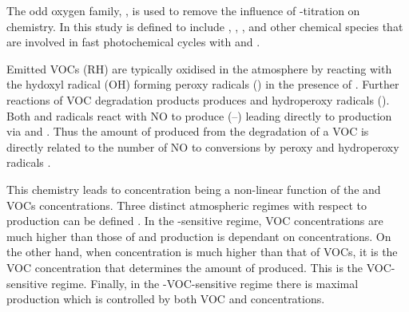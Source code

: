 The odd oxygen family, , is used to remove the influence of -titration on  chemistry. 
In this study  is defined to include , , ,  and other chemical species that are involved in fast photochemical cycles with  and . 

Emitted VOCs (RH) are typically oxidised in the atmosphere by reacting with the hydoxyl radical (OH) forming peroxy radicals () in the presence of  . 
Further reactions of VOC degradation products produces  and hydroperoxy radicals (). 
Both  and  radicals react with NO to produce  (--) leading directly to  production via  and . 
Thus the amount of  produced from the degradation of a VOC is directly related to the number of NO to  conversions by peroxy and hydroperoxy radicals \citep{Atkinson:2000}.
\begin{reactionlist}
\end{reactionlist}

This chemistry leads to  concentration being a non-linear function of the  and VOCs concentrations. 
Three distinct atmospheric regimes with respect to  production can be defined \citep{Jenkin:2000}. 
In the -sensitive regime, VOC concentrations are much higher than those of  and  production is dependant on  concentrations. 
On the other hand, when  concentration is much higher than that of VOCs, it is the VOC concentration that determines the amount of  produced. 
This is the VOC-sensitive regime. 
Finally, in the -VOC-sensitive regime there is maximal  production which is controlled by both VOC and  concentrations.

